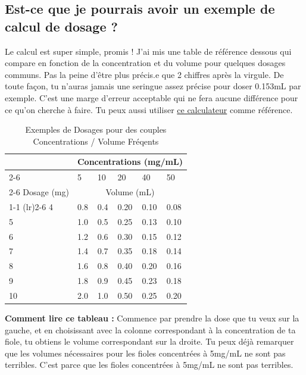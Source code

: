 \documentclass{article}
\begin{document}
\subsection{Est-ce que je pourrais avoir un exemple de calcul de dosage ?}

Le calcul est super simple, promis ! J'ai mis une table de référence dessous qui compare en fonction de la concentration et du volume pour quelques dosages communs. Pas la peine d'être plus précis.e que 2 chiffres après la virgule. De toute façon, tu n'auras jamais une seringue assez précise pour doser 0.153mL par exemple. C'est une marge d'erreur acceptable qui ne fera aucune différence pour ce qu'on cherche à faire. Tu peux aussi utiliser \href{https://web.archive.org/web/20260307075103/https://hrtcafe.net/Calc/}{ce calculateur} comme référence.

\begin{table}[]
\centering
\caption{Exemples de Dosages pour des couples Concentrations / Volume Fréqents}
\label{tab:concentrations}
\begin{tabular}{@{}llllll@{}}
  \toprule
  \multicolumn{1}{c}{} & \multicolumn{5}{c}{Concentrations (mg/mL)} \\
  \cmidrule(rl){2-6}
            & 5    & 10  & 20 & 40 & 50   \\
            \cmidrule(rl){2-6}
Dosage (mg) & \multicolumn{5}{c}{Volume (mL)}  \\
    \cmidrule(r){1-1} \cmidrule(lr){2-6}
4        & 0.8  & 0.4 & 0.20  & 0.10 & 0.08\\
5        & 1.0    & 0.5 & 0.25 & 0.13 &  0.10\\
6        & 1.2  & 0.6   & 0.30  & 0.15 & 0.12   \\
7        & 1.4  & 0.7 & 0.35  & 0.18 & 0.14\\
8        & 1.6  & 0.8   & 0.40  & 0.20 & 0.16  \\
9        & 1.8  & 0.9 & 0.45  & 0.23 & 0.18\\
10       & 2.0    & 1.0   & 0.50  & 0.25 & 0.20 \\
    \bottomrule
\end{tabular}
\end{table}

\textbf{Comment lire ce tableau :} Commence par prendre la dose que tu veux sur la gauche, et en choisissant avec la colonne correspondant à la concentration de ta fiole, tu obtiens le volume correspondant sur la droite. Tu peux déjà remarquer que les volumes nécessaires pour les fioles concentrées à 5mg/mL ne sont pas terribles. C'est parce que les fioles concentrées à 5mg/mL ne sont pas terribles.
\end{document}
